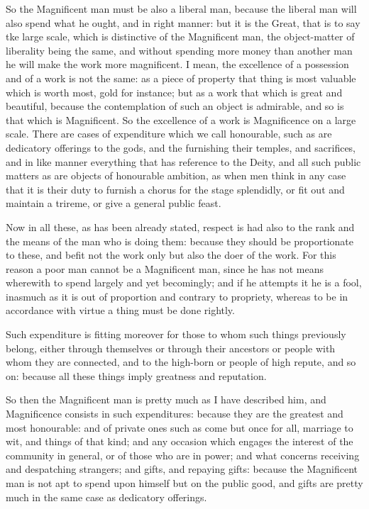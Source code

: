 So the Magnificent man must be also a liberal man, because the liberal man will
also spend what he ought, and in right manner: but it is the Great, that is to
say tke large scale, which is distinctive of the Magnificent man, the
object-matter of liberality being the same, and without spending more money
than another man he will make the work more magnificent. I mean, the excellence
of a possession and of a work is not the same: as a piece of property that
thing is most valuable which is worth most, gold for instance; but as a work
that which is great and beautiful, because the contemplation of such an object
is admirable, and so is that which is Magnificent. So the excellence of a work
is Magnificence on a large scale. There are cases of expenditure which we call
honourable, such as are dedicatory offerings to the gods, and the furnishing
their temples, and sacrifices, and in like manner everything that has reference
to the Deity, and all such public matters as are objects of honourable
ambition, as when men think in any case that it is their duty to furnish a
chorus for the stage splendidly, or fit out and maintain a trireme, or give a
general public feast.

Now in all these, as has been already stated, respect is had also to the rank
and the means of the man who is doing them: because they should be
proportionate to these, and befit not the work only but also the doer of the
work. For this reason a poor man cannot be a Magnificent man, since he has not
means wherewith to spend largely and yet becomingly; and if he attempts it he
is a fool, inasmuch as it is out of proportion and contrary to propriety,
whereas to be in accordance with virtue a thing must be done rightly.

Such expenditure is fitting moreover for those to whom such things previously
belong, either through themselves or through their ancestors or people with
whom they are connected, and to the high-born or people of high repute, and so
on: because all these things imply greatness and reputation.

So then the Magnificent man is pretty much as I have described him, and
Magnificence consists in such expenditures: because they are the greatest and
most honourable: and of private ones such as come but once for all, marriage to
wit, and things of that kind; and any occasion which engages the interest of
the community in general, or of those who are in power; and what concerns
receiving and despatching strangers; and gifts, and repaying gifts: because the
Magnificent man is not apt to spend upon himself but on the public good, and
gifts are pretty much in the same case as dedicatory offerings.

